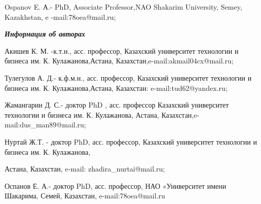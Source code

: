 Ospanov E. А.- PhD, Associate Professor,NAO Shakarim University, Semey,
Kazakhstan, e -mail:78oea@mail.ru;

\emph{{\bfseries Информация об авторах}}

Акишев К. М. -к.т.н., асс. профессор, Казахский университет технологии и
бизнеса им. К. Кулажанова,Астана, Казахстан,e-mail:akmail04cx@mail.ru;

Тулегулов А. Д.- к.ф.м.н., асс. профессор, Казахский университет
технологии и бизнеса им. К. Кулажанова,Астана, Казахстан:
e-mail:tud62@yandex.ru;

Жамангарин Д. С.- доктор PhD , асс. профессор Казахский университет
технологии и бизнеса им. К. Кулажанова, Астана,
Казахстан,e-mail:dus\_man89@mail.ru;

Нуртай Ж.Т. - доктор PhD, асс. профессор, Казахский университет
технологии и бизнеса им. К. Кулажанова,

Астана, Казахстан, e-mail: zhadira\_nurtai@mail.ru;

Оспанов Е. А.- доктор PhD, асс. профессор, НАО «Университет имени
Шакарима, Семей, Казахстан, e-mail:78oea@mail.ru